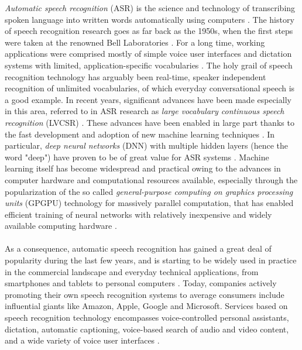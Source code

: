 \documentclass[english, 12pt, a4paper, pdftex, elec, utf8]{aaltothesis}
\begin{document}
\textit{Automatic speech recognition} (ASR) is the science and technology of transcribing spoken language into written words automatically using computers \cite{yu2014automatic, huang2001spoken}. The history of speech recognition research goes as far back as the 1950s, when the first steps were taken at the renowned Bell Laboratories \cite{gales2008application}. For a long time, working applications were comprised mostly of simple voice user interfaces and dictation systems with limited, application-specific vocabularies \cite{yu2014automatic, gales2008application}. The holy grail of speech recognition technology has arguably been real-time, speaker independent recognition of unlimited vocabularies, of which everyday conversational speech is a good example. In recent years, significant advances have been made especially in this area, referred to in ASR research as \textit{large vocabulary continuous speech recognition} (LVCSR) \cite{yu2014automatic, keronen2014approaching}. These advances have been enabled in large part thanks to the fast development and adoption of new machine learning techniques \cite{yu2014automatic, hinton2012deep}. In particular, \textit{deep neural networks} (DNN) with multiple hidden layers (hence the word "deep") have proven to be of great value for ASR systems \cite{yu2014automatic, hinton2012deep}. Machine learning itself has become widespread and practical owing to the advances in computer hardware and computational resources available, especially through the popularization of the so called \textit{general-purpose computing on graphics processing units} (GPGPU) technology for massively parallel computation, that has enabled efficient training of neural networks with relatively inexpensive and widely available computing hardware \cite{yu2014automatic, hinton2012deep}. \\\\
As a consequence, automatic speech recognition has gained a great deal of popularity during the last few years, and is starting to be widely used in practice in the commercial landscape and everyday technical applications, from smartphones and tablets to personal computers \cite{yu2014automatic}. Today, companies actively promoting their own speech recognition systems to average consumers include influential giants like Amazon, Apple, Google and Microsoft. Services based on speech recognition technology encompasses voice-controlled personal assistants, dictation, automatic captioning, voice-based search of audio and video content, and a wide variety of voice user interfaces \cite{yu2014automatic, li2014overview}. \\\\
\end{document}
